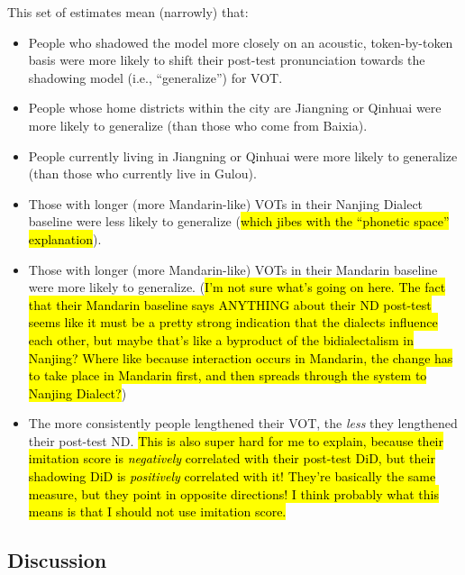 This set of estimates mean (narrowly) that:
\begin{itemize}
    \item People who shadowed the model more closely on an acoustic, token-by-token basis were more likely to shift their post-test pronunciation towards the shadowing model (i.e., ``generalize'') for VOT.
    \item People whose home districts within the city are Jiangning or Qinhuai were more likely to generalize (than those who come from Baixia).
    \item People currently living in Jiangning or Qinhuai were more likely to generalize (than those who currently live in Gulou).
    \item Those with longer (more Mandarin-like) VOTs in their Nanjing Dialect baseline were less likely to generalize (\hl{which jibes with the ``phonetic space'' explanation}).
    \item Those with longer (more Mandarin-like) VOTs in their Mandarin baseline were more likely to generalize. (\hl{I'm not sure what's going on here. The fact that their Mandarin baseline says ANYTHING about their ND post-test seems like it must be a pretty strong indication that the dialects influence each other, but maybe that's like a byproduct of the bidialectalism in Nanjing? Where like because interaction occurs in Mandarin, the change has to take place in Mandarin first, and then spreads through the system to Nanjing Dialect?}) %
    \item The more consistently people lengthened their VOT, the \textit{less} they lengthened their post-test ND. \hl{This is also super hard for me to explain, because their imitation score is \textit{negatively} correlated with their post-test DiD, but their shadowing DiD is \textit{positively} correlated with it! They're basically the same measure, but they point in opposite directions! I think probably what this means is that I should not use imitation score.}%
\end{itemize}
    
\subsection{Discussion}

